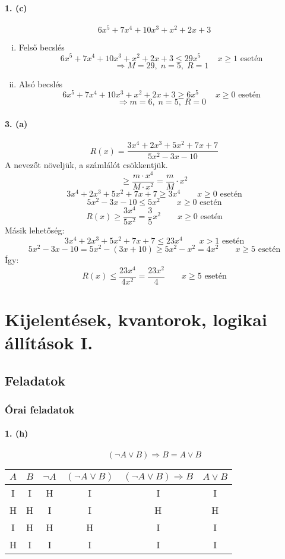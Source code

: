 \documentclass[12pt,a4paper,fleqn]{article}
\newcommand{\myparagraph}[1]{\paragraph{#1}\mbox{}}
\begin{document}
\myparagraph{1. (c)}
\[ 6x^5 + 7x^4 + 10x^3 + x^2 + 2x + 3 \]
\begin{enumerate}[i.]
  \item Felső becslés
  \[ 6x^5 + 7x^4 + 10x^3 + x^2 + 2x + 3 \leq 29x^5 \qquad x \geq 1 \text{ esetén}\]
  \[ \Rightarrow M = 29,\; n = 5,\; R = 1 \]
  \item Alsó becslés
  \[ 6x^5 + 7x^4 + 10x^3 + x^2 + 2x + 3 \geq 6x^5 \qquad x \geq 0 \text{ esetén}\]
  \[ \Rightarrow m = 6,\; n = 5,\; R = 0 \]
\end{enumerate}

\myparagraph{3. (a)}
\[ R(x) = \dfrac{3x^4 + 2x^3 + 5x^2 + 7x + 7}{5x^2 - 3x -10} \]
A nevezőt növeljük, a számlálót csökkentjük.
\[ \geq \dfrac{m \cdot x^4}{M \cdot x^2} = \dfrac{m}{M} \cdot x^2\]
\[ 3x^4 + 2x^3 + 5x^2 + 7x + 7 \geq 3x^4 \qquad x \geq 0 \text{ esetén} \]
\[ 5x^2 - 3x -10 \leq 5x^2 \qquad x \geq 0 \text{ esetén} \]
\[ R(x) \geq \dfrac{3x^4}{5x^2} = \dfrac{3}{5}x^2 \qquad x \geq 0 \text{ esetén} \]
Másik lehetőség:
\[ 3x^4 + 2x^3 + 5x^2 + 7x + 7 \leq 23x^4 \qquad x > 1 \text{ esetén} \]
\[ 5x^2 - 3x -10 = 5x^2 -(3x + 10) \geq 5x^2-x^2 = 4x^2 \qquad x \geq 5 \text{ esetén} \]
Így:
\[ R(x) \leq \dfrac{23x^4}{4x^2} = \dfrac{23x^2}{4} \qquad x \geq 5 \text{ esetén} \]


\clearpage
\section{Kijelentések, kvantorok, logikai állítások I.}
\setcounter{subsection}{1}
\subsection{Feladatok}
\subsubsection{Órai feladatok}


\myparagraph{1. (h)}
\[ (\neg A \lor B) \Rightarrow B = A \lor B \]
\begin{tabular}{c|c||c|c|c||c}
  $A$ & $B$ & $\neg A$ & $(\neg A \lor B)$ & $(\neg A \lor B) \Rightarrow B$ & $A \lor B$ \\
    \hline
  I & I & H & I & I & I \\ \hline
  H & H & I & I & H & H \\ \hline
  I & H & H & H & I & I \\ \hline
  H & I & I & I & I & I \\
\end{tabular}
\end{document}
